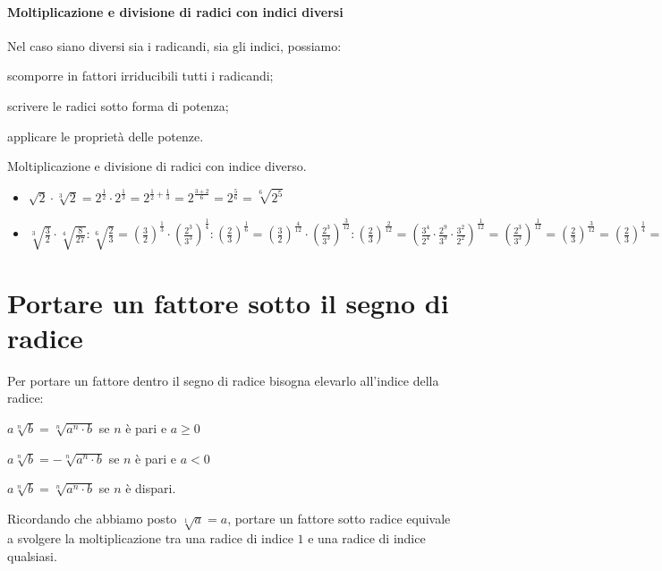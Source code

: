 \paragraph{Moltiplicazione e divisione di radici con indici diversi}

Nel caso siano diversi sia i radicandi, sia gli indici, possiamo:
\begin{procedura}
\begin{enumeratea}
 \item scomporre in fattori irriducibili tutti i radicandi;
 \item scrivere le radici sotto forma di potenza;
 \item applicare le proprietà delle potenze.
\end{enumeratea}
\end{procedura}

 \begin{esempio}
Moltiplicazione e divisione di radici con indice diverso.
\begin{itemize}
\item \(\sqrt{2}\cdot \sqrt[3]2=
       2^\frac{1}{2} \cdot 2^\frac{1}{3} = 2^{\frac{1}{2} + \frac{1}{3}} =
       2^{\frac{3+2}{6}} = 2^{\frac{5}{6}} =\sqrt[6]{2^5}\)
\item 
  \(\sqrt[3]{\frac{3}{2}} \cdot \sqrt[4]{\frac{8}{27}} : 
\sqrt[6]{\frac{2}{3}}=
   \left(\frac{3}{2}\right)^{\frac{1}{3}} \cdot 
   \left(\frac{2^3}{3^3}\right)^{\frac{1}{4}} : 
   \left(\frac{2}{3}\right)^{\frac{1}{6}}=
   \left(\frac{3}{2}\right)^{\frac{4}{12}} \cdot 
   \left(\frac{2^3}{3^3}\right)^{\frac{3}{12}} : 
   \left(\frac{2}{3}\right)^{\frac{2}{12}}=
   \left(\frac{3^4}{2^4} \cdot 
   \frac{2^9}{3^9} \cdot 
   \frac{3^2}{2^2}\right)^{\frac{1}{12}}=
   \left(\frac{2^3}{3^3}\right)^{\frac{1}{12}}=
   \left(\frac{2}{3}\right)^{\frac{3}{12}}=
   \left(\frac{2}{3}\right)^{\frac{1}{4}}=\sqrt[4]{\frac{2}{3}}\)
\end{itemize}
 \end{esempio}

\section{Portare un fattore sotto il segno di radice}
\label{sec:radicali_portare_dentro}

Per portare un fattore dentro il segno di radice bisogna elevarlo 
all'indice della radice:
\begin{itemize*}
 \item \(a\sqrt[n]b=\sqrt[n]{a^n\cdot b}\) se \(n\) è pari e \(a\ge 0\)
 \item \(a\sqrt[n]b=-\sqrt[n]{a^n\cdot b}\) se \(n\) è pari e \(a<0\)
 \item \(a\sqrt[n]b=\sqrt[n]{a^n\cdot b}\) se \(n\) è dispari.
\end{itemize*}
Ricordando che abbiamo posto \(\sqrt[1]a=a\), portare un fattore sotto radice 
equivale a svolgere la moltiplicazione tra una radice di indice \(1\) e una 
radice di indice qualsiasi.

